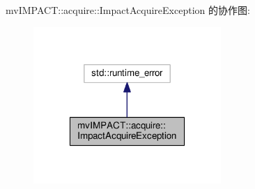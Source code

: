 mv\+I\+M\+P\+A\+C\+T\+:\+:acquire\+:\+:Impact\+Acquire\+Exception 的协作图\+:
\nopagebreak
\begin{figure}[H]
\begin{center}
\leavevmode
\includegraphics[width=202pt]{classmv_i_m_p_a_c_t_1_1acquire_1_1_impact_acquire_exception__coll__graph}
\end{center}
\end{figure}
